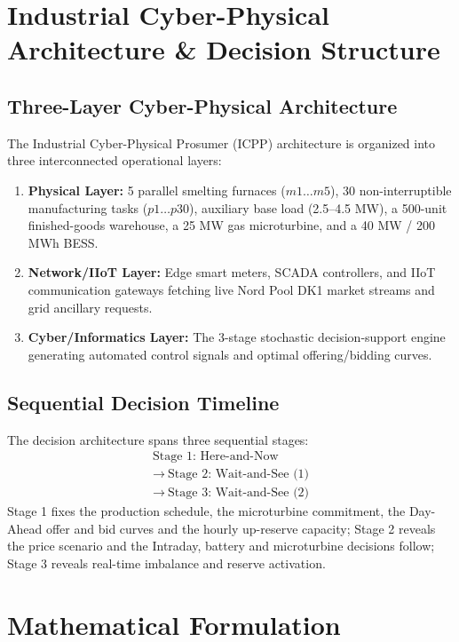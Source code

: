 \documentclass[journal]{IEEEtran}
\begin{document}
\section{Industrial Cyber-Physical Architecture \& Decision Structure}

\subsection{Three-Layer Cyber-Physical Architecture}
The Industrial Cyber-Physical Prosumer (ICPP) architecture is organized into three interconnected operational layers:
\begin{enumerate}
    \item \textbf{Physical Layer:} 5 parallel smelting furnaces ($m1 \dots m5$), 30 non-interruptible manufacturing tasks ($p1 \dots p30$), auxiliary base load (2.5--4.5 MW), a 500-unit finished-goods warehouse, a 25 MW gas microturbine, and a 40 MW / 200 MWh BESS.
    \item \textbf{Network/IIoT Layer:} Edge smart meters, SCADA controllers, and IIoT communication gateways fetching live Nord Pool DK1 market streams and grid ancillary requests.
    \item \textbf{Cyber/Informatics Layer:} The 3-stage stochastic decision-support engine generating automated control signals and optimal offering/bidding curves.
\end{enumerate}

\subsection{Sequential Decision Timeline}
The decision architecture spans three sequential stages:
\begin{equation}
\begin{gathered}
\text{Stage 1: Here-and-Now}\\
\rightarrow\ \text{Stage 2: Wait-and-See (1)}\\
\rightarrow\ \text{Stage 3: Wait-and-See (2)}
\end{gathered}
\label{eq:decision_stages}
\end{equation}
Stage 1 fixes the production schedule, the microturbine commitment, the Day-Ahead offer and bid curves and the hourly up-reserve capacity; Stage 2 reveals the price scenario and the Intraday, battery and microturbine decisions follow; Stage 3 reveals real-time imbalance and reserve activation.

\section{Mathematical Formulation}
\end{document}
